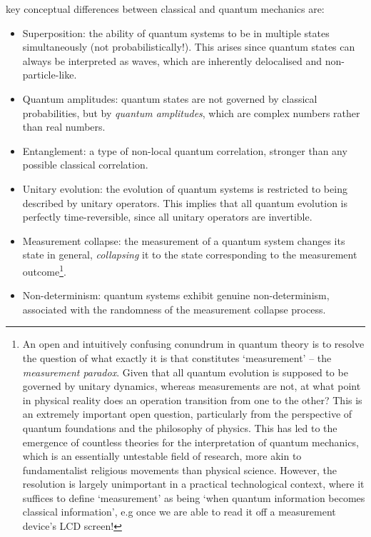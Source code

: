  key conceptual differences between classical and quantum mechanics are:
\begin{itemize}
	\item Superposition: the ability of quantum systems to be in multiple states simultaneously (not probabilistically!). This arises since quantum states can always be interpreted as waves, which are inherently delocalised and non-particle-like.
	\item Quantum amplitudes: quantum states are not governed by classical probabilities, but by \textit{quantum amplitudes}, which are complex numbers rather than real numbers.
	\item Entanglement: a type of non-local quantum correlation, stronger than any possible classical correlation.
	\item Unitary evolution: the evolution of quantum systems is restricted to being described by unitary operators. This implies that all quantum evolution is perfectly time-reversible, since all unitary operators are invertible.
	\item Measurement collapse: the measurement of a quantum system changes its state in general, \textit{collapsing} it to the state corresponding to the measurement outcome\footnote{An open and intuitively confusing conundrum in quantum theory is to resolve the question of what exactly it is that constitutes `measurement' -- the \textit{measurement paradox}. Given that all quantum evolution is supposed to be governed by unitary dynamics, whereas measurements are not, at what point in physical reality does an operation transition from one to the other? This is an extremely important open question, particularly from the perspective of quantum foundations and the philosophy of physics. This has led to the emergence of countless theories for the interpretation of quantum mechanics, which is an essentially untestable field of research, more akin to fundamentalist religious movements than physical science. However, the resolution is largely unimportant in a practical technological context, where it suffices to define `measurement' as being `when quantum information becomes classical information', e.g once we are able to read it off a measurement device's LCD screen!}.
	\item Non-determinism: quantum systems exhibit genuine non-determinism, associated with the randomness of the measurement collapse process.
\end{itemize}

